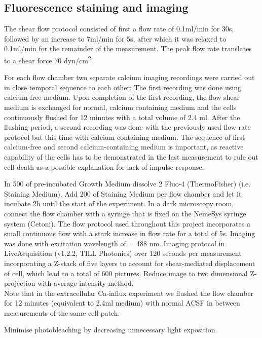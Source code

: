 \subsection{Fluorescence staining and imaging}
\label{sec:LiveImaging}

The shear flow protocol consisted of first a flow rate of 0.1ml/min for 30s, followed by an increase to 7ml/min for 5s, after which it was relaxed to 0.1ml/min for the remainder of the measurement. The peak flow rate translates to a shear force 70 dyn/cm\textsuperscript{2}. 

For each flow chamber two separate calcium imaging recordings were carried out in close temporal sequence to each other: The first recording was done using calcium-free medium. Upon completion of the first recording, the flow shear medium is exchanged for normal, calcium containing medium and the cells continuously flushed for 12 minutes with a total volume of 2.4 ml. After the flushing period, a second recording was done with the previously used flow rate protocol but this time with calcium containing medium. The sequence of first calcium-free and second calcium-containing medium is important, as reactive capability of the cells has to be demonstrated in the last measurement to rule out cell death as a possible explanation for lack of impulse response. 

In 500\mul{} of pre-incubated Growth Medium dissolve 2\mul{} Fluo-4 (ThermoFisher) (i.e. Staining Medium). Add 200\mul{} of Staining Medium per flow chamber and let it incubate 2h until the start of the experiment. 
 In a dark microscopy room, connect the flow chamber with a syringe that is fixed on the NemeSys syringe system (Cetoni). The flow protocol used throughout this project incorporates a small continuous flow with a stark increase in flow rate for a total of 5s. Imaging was done with excitation wavelength of \textlambda{} = 488 nm. Imaging protocol in LiveAcquisition (v1.2.2, TILL Photonics) over 120 seconds per measurement incorporating a Z-stack of five layers to account for shear-mediated displacement of cell, which lead to a total of 600 pictures. Reduce image to two dimensional Z-projection with average intensity method.  \\
Note that in the extracellular Ca-influx experiment we flushed the flow chamber for 12 minutes (equivalent to 2.4ml medium) with normal ACSF in between measurements of the same cell patch.

Minimise photobleaching by decreasing unnecessary light exposition.

